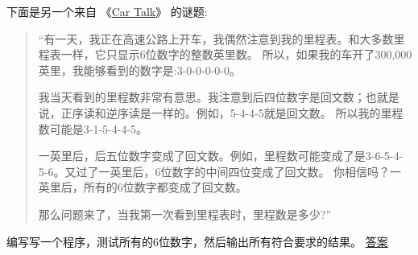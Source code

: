 \begin{exercise}

下面是另一个来自 《\href{http://www.cartalk.com/content/puzzlers}{Car Talk}》 的谜题:
  
  


\begin{quote}
    ``有一天，我正在高速公路上开车，我偶然注意到我的里程表。和大多数里程表一样，它只显示6位数字的整数英里数。
    所以，如果我的车开了300,000英里，我能够看到的数字是:3-0-0-0-0-0。

    我当天看到的里程数非常有意思。我注意到后四位数字是回文数；也就是说，正序读和逆序读是一样的。例如，5-4-4-5就是回文数。
    所以我的里程数可能是3-1-5-4-4-5。

    一英里后，后五位数字变成了回文数。例如，里程数可能变成了是3-6-5-4-5-6。又过了一英里后，6位数字的中间四位变成了回文数。
    你相信吗？一英里后，所有的6位数字都变成了回文数。

    那么问题来了，当我第一次看到里程表时，里程数是多少?''
\end{quote}


编写写一个程序，测试所有的6位数字，然后输出所有符合要求的结果。
\href{http://thinkpython2.com/code/cartalk2.py}{答案}

\end{exercise}


